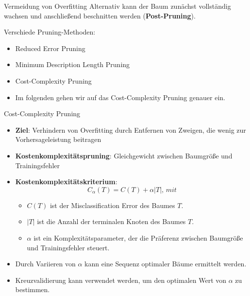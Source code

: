 \documentclass{beamer}
\begin{document}
\begin{frame}{Vermeidung von Overfitting}
Alternativ kann der Baum zunächst vollständig wachsen und anschließend beschnitten werden (\textbf{Post-Pruning}).
 \begin{alertblock}{Verschiede Pruning-Methoden:}
\begin{itemize}
\item Reduced Error Pruning
\item Minimum Description Length Pruning
\item Cost-Complexity Pruning
\item Im folgenden gehen wir auf das Cost-Complexity Pruning genauer ein.

\end{itemize}

\end{alertblock}
\end{frame}

\begin{frame}{Cost-Complexity Pruning}
	\begin{itemize}
		\item {\textbf{Ziel}: Verhindern von Overfitting durch Entfernen von Zweigen, die wenig zur Vorhersageleistung beitragen}
		\item {\textbf{Kostenkomplexitätspruning}: Gleichgewicht zwischen Baumgröße und Trainingsfehler}
		\item \textbf{Kostenkomplexitätskriterium}: \[C_{\alpha}(T) = C(T) + \alpha|T|, \, mit\]
		\begin{itemize}
			\item $C(T)$ ist der Misclassification Error des Baumes $T$.
			\item $|T|$ ist die Anzahl der terminalen Knoten des Baumes $T$.
			\item $\alpha$ ist ein Komplexitätsparameter, der die Präferenz zwischen Baumgröße und Trainingsfehler steuert.
		\end{itemize}
		\item Durch Variieren von $\alpha$ kann eine Sequenz optimaler Bäume ermittelt werden.
		\item Kreuzvalidierung kann verwendet werden, um den optimalen Wert von $\alpha$ zu bestimmen.
	\end{itemize}
\end{frame}

\end{document}
